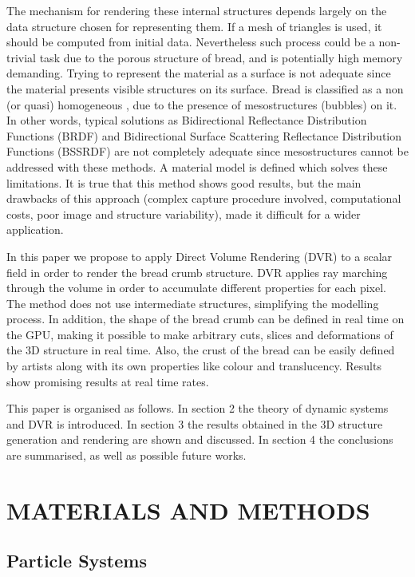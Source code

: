 \documentclass[oneside,a4paper,english,links]{amca}
\begin{document}
The mechanism for rendering these internal structures depends largely on the data structure chosen for representing them. If a mesh of triangles is used, it should be computed from initial data. Nevertheless such process could be a non-trivial task due to the porous structure of bread, and is potentially high memory demanding. Trying to represent the material as a surface is not adequate since the material presents visible structures on its surface. Bread is classified as a non (or quasi) homogeneous \citep{Tong2005}, due to the presence of mesostructures (bubbles) on it. In other words, typical solutions as Bidirectional Reflectance Distribution Functions (BRDF) \citep{Kurt2009} and Bidirectional Surface Scattering Reflectance Distribution Functions (BSSRDF) \citep{Donner2009} are not completely adequate since mesostructures cannot be addressed with these methods. A material model is defined \citep{Tong2005} which solves these limitations. It is true that this method shows good results, but the main drawbacks of this approach (complex capture procedure involved, computational costs, poor image and structure variability), made it difficult for a wider application.

In this paper we propose to apply Direct Volume Rendering (DVR) \citep{Levoy1988,Kruger2003, Kratz2006} to a scalar field in order to render the bread crumb structure. DVR applies ray marching through the volume in order to accumulate different properties for each pixel. The method does not use intermediate structures, simplifying the modelling process. In addition, the shape of the bread crumb can be defined in real time on the GPU, making it possible to make arbitrary cuts, slices and deformations of the 3D structure in real time. Also, the crust of the bread can be easily defined by artists along with its own properties like colour and translucency. Results show promising results at real time rates. 

This paper is organised as follows. In section 2 the theory of dynamic systems and DVR is introduced. In section 3 the results obtained in the 3D structure generation and rendering are shown and discussed. In section 4 the conclusions are summarised, as well as possible future works.

\section{MATERIALS AND METHODS}

\subsection{Particle Systems}
\end{document}

